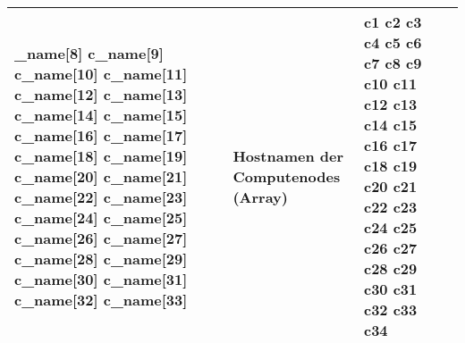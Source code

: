\begin{longtable}{| p{0.5cm} | p{3cm} | p{8.5cm} | p{4cm} |}
\_name[8] \newline c\_name[9] \newline c\_name[10] \newline c\_name[11] \newline c\_name[12] \newline c\_name[13] \newline c\_name[14] \newline c\_name[15] \newline c\_name[16] \newline c\_name[17] \newline c\_name[18] \newline c\_name[19] \newline c\_name[20] \newline c\_name[21] \newline c\_name[22] \newline c\_name[23] \newline c\_name[24] \newline c\_name[25] \newline c\_name[26] \newline c\_name[27] c\_name[28] \newline  c\_name[29] \newline c\_name[30] \newline c\_name[31] \newline c\_name[32] \newline c\_name[33] & Hostnamen der Computenodes (Array) & c1 \newline c2 \newline c3 \newline c4 \newline c5 \newline c6 \newline c7 \newline c8 \newline c9 \newline c10 \newline c11 \newline c12 \newline c13 \newline c14 \newline c15 \newline c16 \newline c17 \newline c18 \newline c19 \newline c20 \newline c21 \newline c22 \newline c23 \newline c24 \newline c25 \newline c26 \newline c27 \newline c28 \newline c29 \newline c30 \newline c31 \newline c32 \newline c33 \newline c34\\\hline 

\end{longtable}
